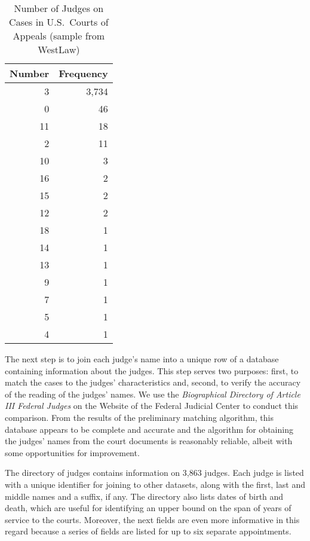 \documentclass[11pt]{paper}
\begin{document}
% 
\begin{table}[ht]
\centering
\begin{tabular}{r r}
  \hline
	Number 		& Frequency \\  
  \hline
		3     & 3,734 \\
		0      &  46 \\
		11     &  18 \\
		2      &  11 \\
		10   &     3 \\
		16   &     2 \\
		15   &     2 \\
		12   &     2 \\
		18   &     1 \\
		14   &     1 \\
		13   &     1 \\
		9     &    1 \\
		7     &    1 \\
		5     &    1 \\
		4     &    1 \\
  \hline
\end{tabular}
\caption{Number of Judges on Cases in U.S.~Courts of Appeals (sample from WestLaw)} 
\label{tab:num_judges}
\end{table}






The next step is to join each judge's name into a unique 
row of a database containing information about the judges. 
This step serves two purposes:
first, to match the cases to the judges' characteristics
and, second, to verify the accuracy of the reading of the judges' names. 
We use the  
{\it Biographical Directory of Article III Federal Judges} 
on the Website of the Federal Judicial Center
to conduct this comparison. 
From the results of the preliminary matching algorithm, 
this database appears to be complete and accurate
and the algorithm for obtaining the judges' names 
from the court documents is reasonably reliable, 
albeit with some opportunities for improvement. 

The directory of judges contains information on 3,863 judges. 
Each judge is listed with a unique identifier for joining to other datasets, 
along with the first, last and middle names and a suffix, if any. 
The directory also lists dates of birth and death, 
which are useful for identifying an upper bound 
on the span of years of service to the courts. 
Moreover, the next fields are even more informative in this regard
because a series of fields are listed for up to six separate appointments. 
\end{document}
